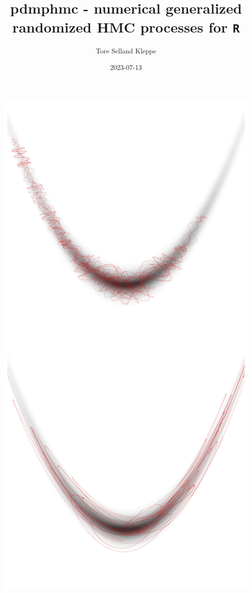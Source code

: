 \documentclass[
]{book}
\title{pdmphmc - numerical generalized randomized HMC processes for \texttt{R}}
\author{Tore Selland Kleppe}
\date{2023-07-13}
\begin{document}
\maketitle

{
\setcounter{tocdepth}{1}
\tableofcontents
}
\includegraphics{cover_image.png}
\end{document}
